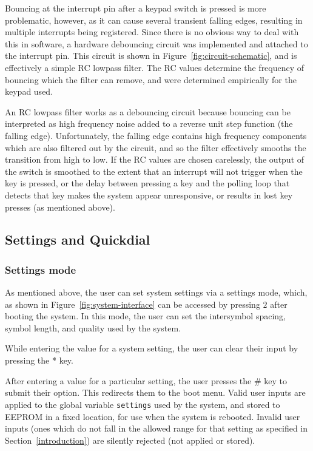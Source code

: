 \documentclass[11pt,a4paper,twocolumn]{scrartcl}
\begin{document}
Bouncing at the interrupt pin after a keypad switch is pressed is more problematic, however, as it can cause several transient falling edges, resulting in multiple interrupts being registered. Since there is no obvious way to deal with this in software, a hardware debouncing circuit was implemented and attached to the interrupt pin. This circuit is shown in Figure~\ref{fig:circuit-schematic}, and is effectively a simple RC lowpass filter. The RC values determine the frequency of bouncing which the filter can remove, and were determined empirically for the keypad used.

An RC lowpass filter works as a debouncing circuit because bouncing can be interpreted as high frequency noise added to a reverse unit step function (the falling edge). Unfortunately, the falling edge contains high frequency components which are also filtered out by the circuit, and so the filter effectively smooths the transition from high to low. If the RC values are chosen carelessly, the output of the switch is smoothed to the extent that an interrupt will not trigger when the key is pressed, or the delay between pressing a key and the polling loop that detects that key makes the system appear unresponsive, or results in lost key presses (as mentioned above).

\subsection{Settings and Quickdial} \label{settings-quickdial}

\subsubsection{Settings mode}

As mentioned above, the user can set system settings via a settings mode, which, as shown in Figure~\ref{fig:system-interface} can be accessed by pressing $2$ after booting the system. In this mode, the user can set the intersymbol spacing, symbol length, and quality used by the system.

While entering the value for a system setting, the user can clear their input by pressing the * key.

After entering a value for a particular setting, the user presses the \# key to submit their option. This redirects them to the boot menu. Valid user inputs are applied to the global variable \verb!settings! used by the system, and stored to EEPROM in a fixed location, for use when the system is rebooted. Invalid user inputs (ones which do not fall in the allowed range for that setting as specified in Section~\ref{introduction}) are silently rejected (not applied or stored).
\end{document}
